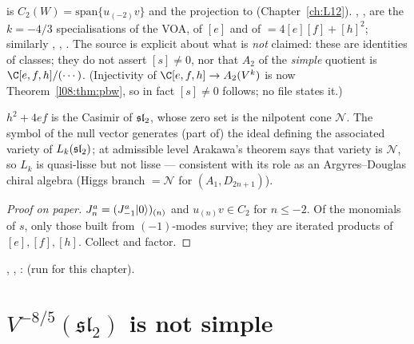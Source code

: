 \begin{dictionary}
 is $C_2(W) = \mathrm{span}\{u_{(-2)}v\}$ and  the projection to
 (Chapter~\ref{ch:L12}). , ,  are the $k=-4/3$
specialisations of the VOA, of $[e]$ and of  $=4[e][f]+[h]^2$; similarly ,
, . The source is explicit about what is \emph{not} claimed: these are
identities of classes; they do not assert $[s]\ne0$, nor that $A_2$ of the \emph{simple} quotient is
$\C[e,f,h]/(\cdots)$. (Injectivity of $\C[e,f,h]\to A_2(V^k)$ is now Theorem~\ref{l08:thm:pbw}, so in
fact $[s]\ne0$ follows; no file states it.)
\end{dictionary}

\begin{physics}
$h^2+4ef$ is the Casimir of $\mathfrak{sl}_2$, whose zero set is the nilpotent cone $\mathcal N$. The symbol of
the null vector generates (part of) the ideal defining the associated variety of $L_k(\mathfrak{sl}_2)$; at
admissible level Arakawa's theorem says that variety is $\mathcal N$, so $L_k$ is quasi-lisse but not
lisse --- consistent with its role as an Argyres--Douglas chiral algebra (Higgs branch $=\mathcal N$
for $(A_1,D_{2n+1})$).
\end{physics}

\begin{proof}[Proof on paper]
$J^a_n = (J^a_{-1}|0\rangle)_{(n)}$ and $u_{(n)}v\in C_2$ for $n\le-2$. Of the monomials of $s$, only those
built from $(-1)$-modes survive; they are iterated products of $[e],[f],[h]$. Collect and factor.
\end{proof}

\begin{status}
, \allowbreak{}\allowbreak{}\allowbreak{}\allowbreak{},
\allowbreak{}\allowbreak{}\allowbreak{}\allowbreak{}\allowbreak{}: \lean{[propext, Classical.}\allowbreak{}\allowbreak\lean{sound]}
(run for this chapter).
\end{status}

\section{\texorpdfstring{$V^{-8/5}(\mathfrak{sl}_2)$}{V\^{}(-8/5)(sl2)} is not simple}\label{l08:sec:notsimple}

